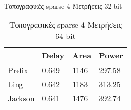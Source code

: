 \begin{multicols}{2}
\begin{table}[H]
\caption{Τοπογραφικές sparse-4 Μετρήσεις 32-bit}
\label{topo_sparse4_result_table_32}
\end{table}
\begin{table}[H]
\centering
     \begin{tabular}{||p{1.2cm} | p{0.7cm} p{1cm} p{1cm} ||} 
        \hline
         & Delay & Area & Power \\ [0.5ex] 
        \hline\hline
        Prefix & 0.649 & 1146 & 297.58 \\
        \hline
        Ling & 0.642 & 1183 & 313.25 \\
        \hline
        Jackson & 0.641 & 1476 & 392.74 \\
        \hline
    \end{tabular}
\caption{Τοπογραφικές sparse-4 Μετρήσεις 64-bit}
\label{topo_sparse4_result_table_64}
\end{table}
\end{multicols}





